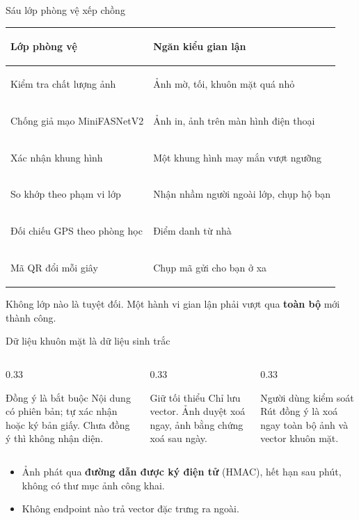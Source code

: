 \documentclass[aspectratio=169, 11pt]{beamer}
\begin{document}
\begin{frame}{Sáu lớp phòng vệ xếp chồng}
  \begin{center}
  \small
  \begin{tabularx}{0.95\textwidth}{@{}>{\bfseries\raggedright\arraybackslash}p{4.6cm} X@{}}
    \toprule
    Lớp phòng vệ & Ngăn kiểu gian lận \\
    \midrule
    Kiểm tra chất lượng ảnh & Ảnh mờ, tối, khuôn mặt quá nhỏ \\
    Chống giả mạo MiniFASNetV2 & Ảnh in, ảnh trên màn hình điện thoại \\
    Xác nhận \FsoKhungXacNhan{} khung hình & Một khung hình may mắn vượt ngưỡng \\
    So khớp theo phạm vi lớp & Nhận nhầm người ngoài lớp, chụp hộ bạn \\
    Đối chiếu GPS theo phòng học & Điểm danh từ nhà \\
    Mã QR đổi mỗi \FgiayDoiQr{} giây & Chụp mã gửi cho bạn ở xa \\
    \bottomrule
  \end{tabularx}
  \end{center}
  \vfill
  {\small\color{gray700} Không lớp nào là tuyệt đối. Một hành vi gian lận
  phải vượt qua \textbf{toàn bộ} mới thành công.}
\end{frame}

\begin{frame}{Dữ liệu khuôn mặt là dữ liệu sinh trắc}
  \begin{columns}[T]
    \begin{column}{0.33\textwidth}
      \begin{block}{Đồng ý là bắt buộc}
        Nội dung có phiên bản; tự xác nhận hoặc ký bản giấy. Chưa đồng ý thì
        không nhận diện.
      \end{block}
    \end{column}
    \begin{column}{0.33\textwidth}
      \begin{block}{Giữ tối thiểu}
        Chỉ lưu vector. Ảnh duyệt xoá ngay, ảnh bằng chứng xoá sau
        \FngayLuuAnh{} ngày.
      \end{block}
    \end{column}
    \begin{column}{0.33\textwidth}
      \begin{block}{Người dùng kiểm soát}
        Rút đồng ý là xoá ngay toàn bộ ảnh và vector khuôn mặt.
      \end{block}
    \end{column}
  \end{columns}
  \vfill
  \begin{itemize}
    \item Ảnh phát qua \textbf{đường dẫn được ký điện tử} (HMAC), hết hạn sau
          \FphutHetHanUrl{} phút, không có thư mục ảnh công khai.
    \item Không endpoint nào trả vector đặc trưng ra ngoài.
  \end{itemize}
\end{frame}
\end{document}
